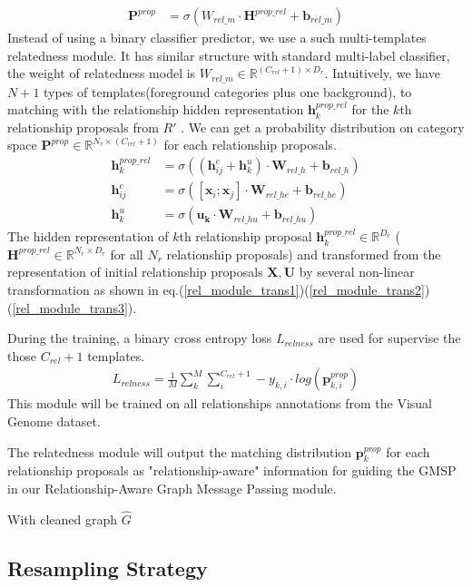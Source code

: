 \begin{align}
    \mathbf{P}^{prop} &= \sigma (W_{rel\_m} \cdot \mathbf{H}^{prop\_rel}  + \mathbf{b}_{rel\_m} ) 
\label{rel_module}
\end{align}
Instead of using a binary classifier predictor, we use a such multi-templates relatedness module.
It has similar structure with standard multi-label classifier, the weight of relatedness model is $W_{rel\_m} \in \mathbb{R}^{(C_{rel} + 1) \times D_r}$. Intuitively, we have $N+1$ types of templates(foreground categories plus one background), to matching with the relationship hidden representation $\mathbf{h}_{k}^{prop\_rel}$ for the $k$th relationship proposals from $R'$ . 
We can get a probability distribution on category space $\mathbf{P}^{prop} \in \mathbb{R}^{N_r \times (C_{rel} + 1)}$ for each relationship proposals.
% 
\begin{align}
    \mathbf{h}_{k}^{prop\_rel}& = \sigma(( \mathbf{h}^{e}_{ij} + \mathbf{h}^{u}_k) \cdot \mathbf{W}_{rel\_h}   + \mathbf{b}_{rel\_h}) \label{rel_module_trans1} \\
    \mathbf{h}^{e}_{ij} &= \sigma([\mathbf{x}_i; \mathbf{x}_j] \cdot \mathbf{W}_{rel\_he}+ \mathbf{b}_{rel\_he})  \label{rel_module_trans2} \\
    \mathbf{h}^{u}_k &= \sigma(\mathbf{u_{k}} \cdot \mathbf{W}_{rel\_hu} + \mathbf{b}_{rel\_hu})
\label{rel_module_trans3}
\end{align}
% 
The hidden representation of $k$th relationship proposal $\mathbf{h}_{k}^{prop\_rel} \in \mathbb{R}^{D_r}$ ($ \mathbf{H}^{prop\_rel} \in \mathbb{R}^{N_r \times D_r}$ for all $N_r$ relationship proposals) and transformed from the representation of initial relationship proposals $\mathbf{X}, \mathbf{U}$ by several non-linear transformation as shown in eq.(\ref{rel_module_trans1})(\ref{rel_module_trans2})(\ref{rel_module_trans3}).

During the training, a binary cross entropy loss $L_{relness}$ are used for supervise the those $C_{rel} + 1$ templates.
\begin{align}
L_{relness} = \frac{1}{M}\sum_k^{M}\sum_i^{C_{rel} + 1} -y_{k,i} \cdot log(\mathbf{p}_{k,i}^{prop})
\end{align}
This module will be trained on all relationships annotations from the Visual Genome dataset.

The relatedness module will output the matching distribution $\mathbf{p}^{prop}_{k}$ for each relationship proposals as "relationship-aware" information for guiding the GMSP in our Relationship-Aware Graph Message Passing module.






With cleaned graph $\hat{G}$
\subsection{Resampling Strategy}
